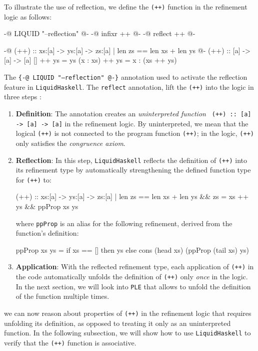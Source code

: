 To illustrate the use of reflection, we define the \texttt{(++)} function in the refinement logic as follows:

\begin{code}
	{-@ LIQUID "--reflection" @-}
	{-@ infixr ++ @-}
	{-@ reflect ++ @-}

	{-@ (++) :: xs:[a] -> ys:[a] -> { zs:[a] | len zs == len xs + len ys } @-}
	(++) :: [a] -> [a] -> [a]
	[] ++ ys = ys
	(x : xs) ++ ys = x : (xs ++ ys)
\end{code}
The \texttt{\{-@ LIQUID "--reflection" @-\}} annotation used to activate the reflection feature in \texttt{LiquidHaskell}.
The \texttt{reflect} annotation, lift the \texttt{(++)} into the logic in three steps \cite{vazou2018}:
\begin{enumerate}
	\item \textbf{Definition}: The annotation creates an \textit{uninterpreted function} \texttt{
	      (++) :: [a] -> [a] -> [a]} in the refinement logic. By uninterpreted, we mean that the logical \texttt{(++)} is
	      not connected to the program function \texttt{(++)}; in the logic, \texttt{(++)} only satisfies the \textit{congruence axiom}.
	\item \textbf{Reflection}: In this step, \texttt{LiquidHaskell} reflects the definition of \texttt{(++)} into its refinement type
	      by automatically strengthening the defined function type for \texttt{(++)} to:


\begin{code}
  (++) :: xs:[a] -> ys:[a]
  -> { zs:[a] | len zs == len xs + len ys
  && zs = xs ++ ys
  && ppProp xs ys }
\end{code}
	      where \texttt{ppProp} is an alias for the following refinement, derived from the function's definition:
\begin{code}
  ppProp xs ys = if xs == [] then ys
  else cons (head xs) (ppProp (tail xs) ys)

\end{code}
	\item \textbf{Application}: With the reflected refinement type, each application of \texttt{(++)}
	      in the code automatically unfolds the definition of \texttt{(++)} only \textit{once} in the logic. In the
	      next section, we will look into \texttt{PLE} that allows to unfold the definition of the function multiple times.
\end{enumerate}
we can now reason about properties of \texttt{(++)} in the refinement logic that requires unfolding its definition,
as opposed to treating it only as an uninterpreted function.
In the following subsection,
we will show how to use \texttt{LiquidHaskell} to verify that the \texttt{(++)} function is associative.

